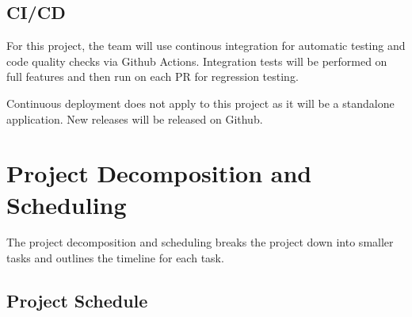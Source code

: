 \documentclass{article}
\begin{document}
\subsection{CI/CD}

For this project, the team will use continous integration for automatic testing and code quality checks via Github Actions. 
Integration tests will be performed on full features and then run on each PR for regression testing. 

\noindent
Continuous deployment does not apply to this project as it will be a standalone application. New releases will
be released on Github.
\section{Project Decomposition and Scheduling}
The project decomposition and scheduling breaks the project down into smaller tasks and outlines the timeline for each task.

\subsection{Project Schedule}
\end{document}
